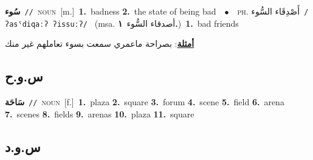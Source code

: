 \documentclass[10pt,a4paper,twoside]{article} %
\begin{document}
\begin{multicols}{2}
{\setlength\topsep{0pt}\textbf{\foreignlanguage{arabic}{سُوء}}\ {\color{gray}\texttt{//}\color{black}}\ \textsc{noun}\ [m.]\ \textbf{1.}~badness  \textbf{2.}~the state of being bad\ \ $\bullet$\ \ \textsc{ph.} \color{gray} \foreignlanguage{arabic}{أَصْدِقَاء السُّوء}\color{black}\ {\color{gray}\texttt{/{\sffamily ʔasˤdiqaːʔ ʔissuːʔ}/}\color{black}}\ \color{gray} (msa. \foreignlanguage{arabic}{أصدقاء السُّوء}~\foreignlanguage{arabic}{\textbf{١.}})\color{black}\ \textbf{1.}~bad friends\  \begin{flushright}\color{gray}\foreignlanguage{arabic}{\textbf{\underline{\foreignlanguage{arabic}{أمثلة}}}: بصراحة ماعمري سمعت بسوء تعاملهم غير منك}\end{flushright}\color{black}} \vspace{2mm}

\vspace{-3mm}
\subsection*{\color{blue}\foreignlanguage{arabic}{س.و.ح}\color{blue}{}} 

{\setlength\topsep{0pt}\textbf{\foreignlanguage{arabic}{سَاحَة}}\ {\color{gray}\texttt{//}\color{black}}\ \textsc{noun}\ [f.]\ \textbf{1.}~plaza  \textbf{2.}~square  \textbf{3.}~forum  \textbf{4.}~scene  \textbf{5.}~field  \textbf{6.}~arena  \textbf{7.}~scenes  \textbf{8.}~fields  \textbf{9.}~arenas  \textbf{10.}~plaza  \textbf{11.}~square\ } \vspace{2mm}

\vspace{-3mm}
\subsection*{\color{blue}\foreignlanguage{arabic}{س.و.د}\color{blue}{}} 


\end{multicols}
\end{document}
